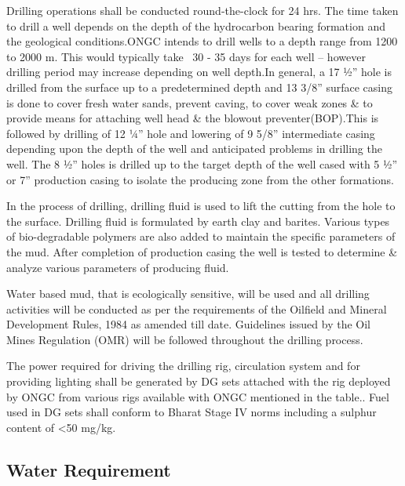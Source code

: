 \documentclass[11pt,a4paper]{article}
\begin{document}
Drilling operations shall be conducted round-the-clock for 24 hrs. The time taken to drill a well depends on the depth of the hydrocarbon bearing formation and the geological conditions.ONGC intends to drill wells to a depth range from 1200 to 2000 m. This would typically take ~30 - 35 days for each well – however drilling period may increase depending on well depth.In general, a 17 1⁄2” hole is drilled from the surface up to a predetermined depth and 13 3/8” surface casing is done to cover fresh water sands, prevent caving, to cover weak zones \& to provide means for attaching well head \& the blowout preventer(BOP).This is followed by drilling of 12 1⁄4” hole and lowering of 9 5/8” intermediate casing depending upon the depth of the well and anticipated problems in drilling the well. The 8 1⁄2” holes is drilled up to the target depth of the well cased with 5 1⁄2” or 7” production casing to isolate the producing zone from the other formations.

In the process of drilling, drilling fluid is used to lift the cutting from the hole to the surface. Drilling fluid is formulated by earth clay and barites. Various types of bio-degradable polymers are also added to maintain the specific parameters of the mud. After completion of production casing the well is tested to determine \& analyze various parameters of producing fluid.

Water based mud, that is ecologically sensitive, will be used and all drilling activities will be conducted as per the requirements of the Oilfield and Mineral Development Rules, 1984 as amended till date. Guidelines issued by the Oil Mines Regulation (OMR) will be followed throughout the drilling process.

The power required for driving the drilling rig, circulation system and for providing lighting shall be generated by DG sets attached with the rig deployed by ONGC from various rigs available with ONGC mentioned in the table.. Fuel used in DG sets shall conform to Bharat Stage IV norms including a sulphur content of <50 mg/kg.


\subsection{\textbf{Water Requirement}}
\end{document}
